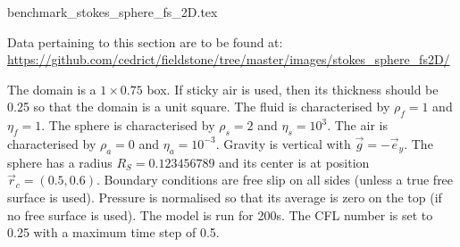 \begin{flushright} {\tiny {\color{gray} benchmark\_stokes\_sphere\_fs\_2D.tex}} \end{flushright}

\vspace{1cm}
\begin{flushright}
Data pertaining to this section are to be found at:
\url{https://github.com/cedrict/fieldstone/tree/master/images/stokes\_sphere\_fs2D/}
\end{flushright}
\vspace{1cm}


The domain is a $1\times 0.75$ box. If sticky air is used, then its thickness should be 0.25 so that the
domain is a unit square. 
The fluid is characterised by $\rho_f=1$ and $\eta_f=1$. The sphere is characterised by $\rho_s=2$ and
$\eta_s=10^3$. The air is characterised by $\rho_a=0$ and $\eta_a=10^{-3}$. Gravity is 
vertical with $\vec{g}=-\vec{e}_y$.
The sphere has a radius $R_S=0.123456789$ and its center is at position $\vec{r}_c=(0.5,0.6)$. 
Boundary conditions are free slip on all sides (unless a true free surface is used).
Pressure is normalised so that its average is zero on the top (if no free surface is used).
The model is run for 200s. The CFL number is set to 0.25 with a maximum time step of 0.5. 

